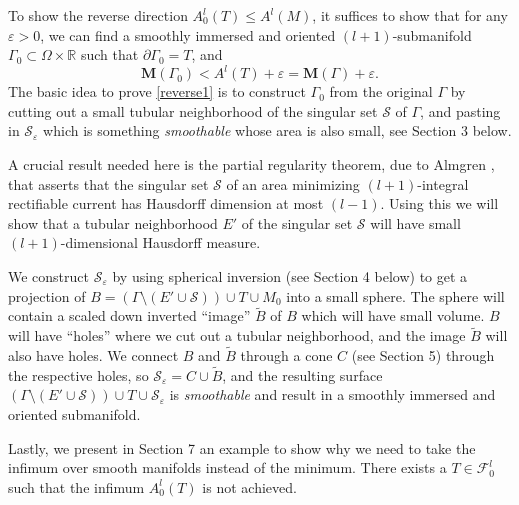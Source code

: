 \documentclass{amsart}
\numberwithin{equation}{section}
\theoremstyle{definition}
\theoremstyle{remark}
\newcommand{\R}{\mathbb{R}}
\begin{document}
To show the reverse direction {$A_0^l(T) \leq A^l(M)$},  it suffices to show that for any $\varepsilon >0$, we can find a smoothly immersed and oriented $(l+1)$-submanifold $\Gamma_0{\subset\Omega\times\R}$ such that {{$\partial\Gamma_0=T$, and}}
\begin{equation}\label{reverse1}
 \mathbf{M}(\Gamma_0) <A^l(T)+\varepsilon= \mathbf{M}(\Gamma) +\varepsilon .
 \end{equation}
\indent The basic idea  to prove \eqref{reverse1} is to
construct $\Gamma_0$ from the original $\Gamma$ by cutting out a small tubular neighborhood  
of the singular set $\mathcal{S}$ of $\Gamma$, and pasting in $\mathcal{S}_\varepsilon$ which is something 
{\it smoothable} whose  area is also small, see Section 3 below.

\indent A crucial result needed here is the partial regularity theorem, due to Almgren \cite{Almgren}, 
that asserts that the singular set $\mathcal{S}$ of an area minimizing 
{$(l+1)$-integral rectifiable} current has Hausdorff dimension at most $(l-1)$. Using this we will show that a tubular neighborhood 
$E'$ of the singular set $\mathcal{S}$ will have small $(l+1)${-dimensional} Hausdorff measure.

We construct $\mathcal{S}_\varepsilon$ by using spherical inversion (see Section 4 below) to get a projection of $B = (\Gamma \setminus (E'\cup\mathcal{S})) \cup T \cup M_0 $ into a small sphere. The sphere will contain a scaled down inverted ``image'' $\widetilde{B}$ of $ B$ which will have small volume. $B$ will have ``holes'' where we cut out a tubular neighborhood, and the image $\widetilde{B}$ will also have holes. We connect $B$ and $\widetilde{B}$ through a cone $C$
(see Section 5) through the respective holes, so $\mathcal{S}_\varepsilon = C\cup \widetilde {B}$, and the resulting surface $(\Gamma \setminus (E'\cup\mathcal{S})) \cup T \cup \mathcal{S}_\varepsilon$ is {\it smoothable} and result in a smoothly immersed and oriented submanifold.

Lastly, we present in Section 7 an example to show why we need to take the infimum over smooth manifolds instead of the minimum. There exists 
a $T{\in\mathcal{F}_0^l}$ such that the infimum $A^l_0(T)$ is not achieved.
\end{document}
